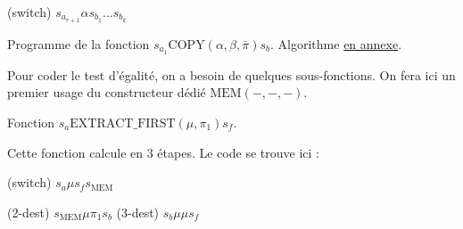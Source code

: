 \begin{appendices}
		
		\begin{algorithm}[H]
			\label{prog:A_RAM_fn_COPY}
			
			
			(switch) 	$s_{a_{r+1}} \alpha s_{b_1} \dots s_{b_k}$\;
			
			
			
			\caption{Programme de la fonction $s_{a_1}\text{COPY}(\alpha, \beta, \bar{\pi}) s_b$. Algorithme \hyperref[algo:A_RAM_fn_COPY]{en annexe}.}
		\end{algorithm}
		
		\espace
		
		Pour coder le test d'égalité, on a besoin de quelques sous-fonctions. On fera ici un premier usage du constructeur dédié $\text{MEM}\left( -, -, -\right)$.
		
		\espace
		
		\begin{algorithm}[H]
			\label{algo:A_RAM_fn_extract_first}
			
			
			\caption{Fonction $s_a \text{EXTRACT\_FIRST}(\mu, \pi_1) s_f$. }
		\end{algorithm}
		
		\espace
		
		Cette fonction calcule en $3$ étapes. Le code se trouve ici :
		
		\espace
		
		\begin{algorithm}[H]
			\label{prog:A_RAM_fn_extract_first}
			
			(switch)	$s_a \mu s_f s_{\text{MEM}}$\;
			
			(2-dest) 	$s_{\text{MEM}} \mu \pi_1 s_b$\;
			(3-dest) 	$s_b \mu \mu s_f$\;
			

\end{algorithm}
\end{appendices}
